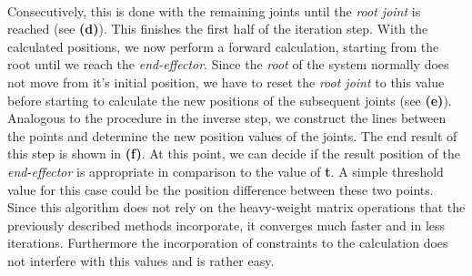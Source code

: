 \\Consecutively, this is done with the remaining joints until the \textit{root joint} is reached (see \textbf{(d)}).
This finishes the first half of the iteration step. With the calculated positions, we now perform a forward calculation, starting from the root until we reach the \textit{end-effector}. Since the \textit{root} of the system normally does not move from it's initial position, we have to reset the \textit{root joint} to this value before starting to calculate the new positions of the subsequent joints (see\textbf{ (e)}).
\\
Analogous to the procedure in the inverse step, we construct the lines between the points and determine the new position values of the joints. The end result of this step is shown in \textbf{(f)}. At this point, we can decide if the result position of the \textit{end-effector} is appropriate in comparison to the value of \textbf{t}. A simple threshold value for this case could be the position difference between these two points.
\\Since this algorithm does not rely on the heavy-weight matrix operations that the previously described methods incorporate, it converges much faster and in less iterations. Furthermore the incorporation of constraints to the calculation does not interfere with this values and is rather easy.
